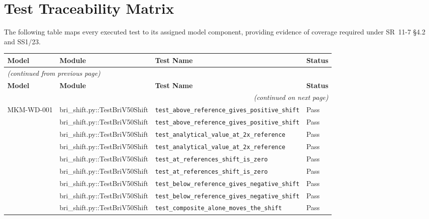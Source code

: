 \documentclass[11pt,a4paper]{article}
\begin{document}
\section{Test Traceability Matrix}

The following table maps every executed test to its assigned model component, providing evidence of coverage required under SR~11-7 \S4.2 and SS1/23.

\begin{center}
\small
\begin{longtable}{p{2.2cm} p{4.5cm} p{6.5cm} p{1.4cm}}
    \toprule
    \textbf{Model} & \textbf{Module} & \textbf{Test Name} & \textbf{Status} \\
    \midrule
    \endfirsthead
    \multicolumn{4}{l}{\emph{(continued from previous page)}} \\
    \toprule
    \textbf{Model} & \textbf{Module} & \textbf{Test Name} & \textbf{Status} \\
    \midrule
    \endhead
    \midrule
    \multicolumn{4}{r}{\emph{(continued on next page)}} \\
    \endfoot
    \bottomrule
    \endlastfoot
    MKM-WD-001 & bri\_shift.py::TestBriV50Shift & \texttt{test\_above\_reference\_gives\_positive\_shift} & \textcolor{green!60!black}{Pass} \\
     & bri\_shift.py::TestBriV50Shift & \texttt{test\_above\_reference\_gives\_positive\_shift} & \textcolor{green!60!black}{Pass} \\
     & bri\_shift.py::TestBriV50Shift & \texttt{test\_analytical\_value\_at\_2x\_reference} & \textcolor{green!60!black}{Pass} \\
     & bri\_shift.py::TestBriV50Shift & \texttt{test\_analytical\_value\_at\_2x\_reference} & \textcolor{green!60!black}{Pass} \\
     & bri\_shift.py::TestBriV50Shift & \texttt{test\_at\_references\_shift\_is\_zero} & \textcolor{green!60!black}{Pass} \\
     & bri\_shift.py::TestBriV50Shift & \texttt{test\_at\_references\_shift\_is\_zero} & \textcolor{green!60!black}{Pass} \\
     & bri\_shift.py::TestBriV50Shift & \texttt{test\_below\_reference\_gives\_negative\_shift} & \textcolor{green!60!black}{Pass} \\
     & bri\_shift.py::TestBriV50Shift & \texttt{test\_below\_reference\_gives\_negative\_shift} & \textcolor{green!60!black}{Pass} \\
     & bri\_shift.py::TestBriV50Shift & \texttt{test\_composite\_alone\_moves\_the\_shift} & \textcolor{green!60!black}{Pass} \\

\end{longtable}
\end{center}
\end{document}
